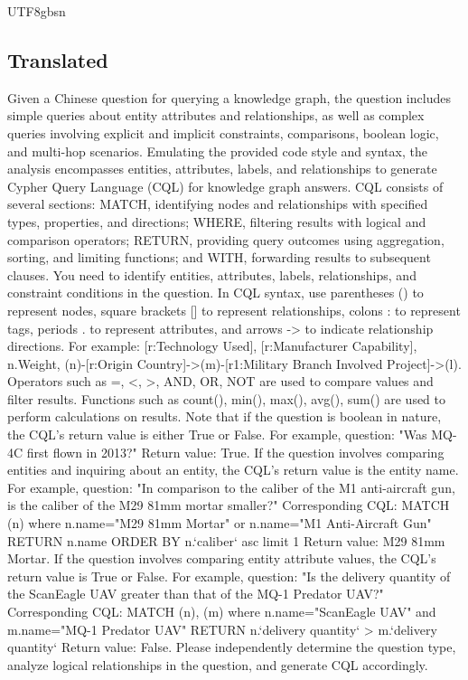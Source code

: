 \documentclass[runningheads]{llncs}
\begin{document}
\begin{CJK*}{UTF8}{gbsn}
\subsection*{Translated}
Given a Chinese question for querying a knowledge graph, the question includes simple queries about entity attributes and relationships, as well as complex queries involving explicit and implicit constraints, comparisons, boolean logic, and multi-hop scenarios. Emulating the provided code style and syntax, the analysis encompasses entities, attributes, labels, and relationships to generate Cypher Query Language (CQL) for knowledge graph answers.
CQL consists of several sections: MATCH, identifying nodes and relationships with specified types, properties, and directions; WHERE, filtering results with logical and comparison operators; RETURN, providing query outcomes using aggregation, sorting, and limiting functions; and WITH, forwarding results to subsequent clauses. 
You need to identify entities, attributes, labels, relationships, and constraint conditions in the question. In CQL syntax, use parentheses () to represent nodes, square brackets [] to represent relationships, colons : to represent tags, periods . to represent attributes, and arrows -> to indicate relationship directions. For example: [r:Technology Used], [r:Manufacturer Capability], n.Weight, (n)-[r:Origin Country]->(m)-[r1:Military Branch Involved Project]->(l).
Operators such as =, <, >, AND, OR, NOT are used to compare values and filter results. Functions such as count(), min(), max(), avg(), sum() are used to perform calculations on results. Note that if the question is boolean in nature, the CQL's return value is either True or False. For example, question: "Was MQ-4C first flown in 2013?" Return value: True.
If the question involves comparing entities and inquiring about an entity, the CQL's return value is the entity name. For example, question: "In comparison to the caliber of the M1 anti-aircraft gun, is the caliber of the M29 81mm mortar smaller?" Corresponding CQL: MATCH (n) where n.name="M29 81mm Mortar" or n.name="M1 Anti-Aircraft Gun" RETURN n.name ORDER BY n.`caliber` asc limit 1 Return value: M29 81mm Mortar.
If the question involves comparing entity attribute values, the CQL's return value is True or False. For example, question: "Is the delivery quantity of the ScanEagle UAV greater than that of the MQ-1 Predator UAV?" Corresponding CQL: MATCH (n), (m) where n.name="ScanEagle UAV" and m.name="MQ-1 Predator UAV" RETURN n.`delivery quantity` > m.`delivery quantity` Return value: False.
Please independently determine the question type, analyze logical relationships in the question, and generate CQL accordingly.


\end{CJK*}
\end{document}

